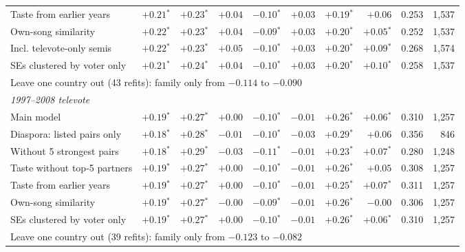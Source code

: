 \begin{table}[t]
{\begin{tabular}{lrrrrrrrrr}
Taste from earlier years & $+0.21$$^{*}$ & $+0.23$$^{*}$ & $+0.04$ & $-0.10$$^{*}$ & $+0.03$ & $+0.19$$^{*}$ & $+0.06$ & 0.253 & 1{,}537 \\
Own-song similarity & $+0.22$$^{*}$ & $+0.23$$^{*}$ & $+0.04$ & $-0.09$$^{*}$ & $+0.03$ & $+0.20$$^{*}$ & $+0.05$$^{*}$ & 0.252 & 1{,}537 \\
Incl. televote-only semis & $+0.22$$^{*}$ & $+0.23$$^{*}$ & $+0.05$ & $-0.10$$^{*}$ & $+0.03$ & $+0.20$$^{*}$ & $+0.09$$^{*}$ & 0.268 & 1{,}574 \\
SEs clustered by voter only & $+0.21$$^{*}$ & $+0.24$$^{*}$ & $+0.04$ & $-0.10$$^{*}$ & $+0.03$ & $+0.20$$^{*}$ & $+0.10$$^{*}$ & 0.258 & 1{,}537 \\
\multicolumn{10}{l}{Leave one country out (43 refits): family only from $-0.114$ to $-0.090$} \\ \hline
\multicolumn{10}{l}{\textit{1997--2008 televote}} \\
Main model & $+0.19$$^{*}$ & $+0.27$$^{*}$ & $+0.00$ & $-0.10$$^{*}$ & $-0.01$ & $+0.26$$^{*}$ & $+0.06$$^{*}$ & 0.310 & 1{,}257 \\
Diaspora: listed pairs only & $+0.18$$^{*}$ & $+0.28$$^{*}$ & $-0.01$ & $-0.10$$^{*}$ & $-0.03$ & $+0.29$$^{*}$ & $+0.06$ & 0.356 & 846 \\
Without 5 strongest pairs & $+0.18$$^{*}$ & $+0.29$$^{*}$ & $-0.03$ & $-0.11$$^{*}$ & $-0.01$ & $+0.23$$^{*}$ & $+0.07$$^{*}$ & 0.280 & 1{,}248 \\
Taste without top-5 partners & $+0.19$$^{*}$ & $+0.27$$^{*}$ & $+0.00$ & $-0.10$$^{*}$ & $-0.01$ & $+0.26$$^{*}$ & $+0.05$ & 0.308 & 1{,}257 \\
Taste from earlier years & $+0.19$$^{*}$ & $+0.27$$^{*}$ & $+0.00$ & $-0.10$$^{*}$ & $-0.01$ & $+0.25$$^{*}$ & $+0.07$$^{*}$ & 0.311 & 1{,}257 \\
Own-song similarity & $+0.19$$^{*}$ & $+0.27$$^{*}$ & $-0.00$ & $-0.09$$^{*}$ & $-0.01$ & $+0.26$$^{*}$ & $-0.00$ & 0.306 & 1{,}257 \\
SEs clustered by voter only & $+0.19$$^{*}$ & $+0.27$$^{*}$ & $+0.00$ & $-0.10$$^{*}$ & $-0.01$ & $+0.26$$^{*}$ & $+0.06$$^{*}$ & 0.310 & 1{,}257 \\
\multicolumn{10}{l}{Leave one country out (39 refits): family only from $-0.123$ to $-0.082$} \\ \hline
\end{tabular}}
\end{table}
